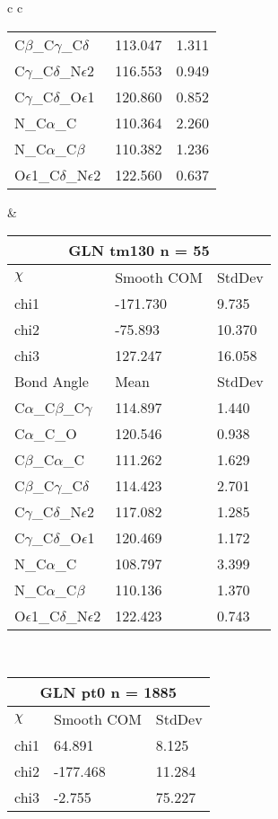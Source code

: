 \begin{longtable}{ c c }
\begin{tabular}{ l l l }
  C$\beta$\_C$\gamma$\_C$\delta$ & 113.047 & 1.311\\
  C$\gamma$\_C$\delta$\_N$\epsilon$2 & 116.553 & 0.949\\
  C$\gamma$\_C$\delta$\_O$\epsilon$1 & 120.860 & 0.852\\
  N\_C$\alpha$\_C & 110.364 & 2.260\\
  N\_C$\alpha$\_C$\beta$ & 110.382 & 1.236\\
  O$\epsilon$1\_C$\delta$\_N$\epsilon$2 & 122.560 & 0.637\\
  \bottomrule
  \end{tabular}
  &
  \begin{tabular}{ l l l }
  \toprule
  \multicolumn{3}{c}{GLN \textbf{tm130} n = 55} \\ \toprule
  $\chi$       & Smooth COM & StdDev \\ \midrule
  chi1 & -171.730 & 9.735 \\ 
  chi2 & -75.893 & 10.370 \\ 
  chi3 & 127.247 & 16.058 \\ \midrule
  Bond Angle   & Mean     & StdDev \\ \midrule
  C$\alpha$\_C$\beta$\_C$\gamma$ & 114.897 & 1.440\\
  C$\alpha$\_C\_O & 120.546 & 0.938\\
  C$\beta$\_C$\alpha$\_C & 111.262 & 1.629\\
  C$\beta$\_C$\gamma$\_C$\delta$ & 114.423 & 2.701\\
  C$\gamma$\_C$\delta$\_N$\epsilon$2 & 117.082 & 1.285\\
  C$\gamma$\_C$\delta$\_O$\epsilon$1 & 120.469 & 1.172\\
  N\_C$\alpha$\_C & 108.797 & 3.399\\
  N\_C$\alpha$\_C$\beta$ & 110.136 & 1.370\\
  O$\epsilon$1\_C$\delta$\_N$\epsilon$2 & 122.423 & 0.743\\
  \bottomrule
  \end{tabular}
  \\
  \begin{tabular}{ l l l }
  \toprule
  \multicolumn{3}{c}{GLN \textbf{pt0} n = 1885} \\ \toprule
  $\chi$       & Smooth COM & StdDev \\ \midrule
  chi1 & 64.891 & 8.125 \\ 
  chi2 & -177.468 & 11.284 \\ 
  chi3 & -2.755 & 75.227 \\ \midrule

\end{tabular}
\end{longtable}
